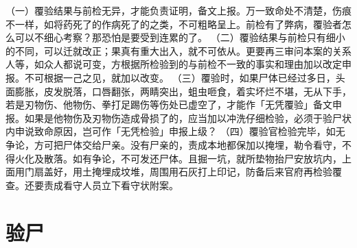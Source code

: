 \documentclass[12pt,UTF8]{ctexbook}
\begin{document}
（一）覆验结果与前检无异，才能负责证明，备文上报。万一致命处不清楚，伤痕不一样，如将药死了的作病死了的之类，不可粗略呈上。前检有了弊病，覆验者怎么可以不细心考察？那恐怕是要受到连累的了。
（二）覆验结果与前检只有细小的不同，可以迁就改正；果真有重大出入，就不可依从。更要再三审问本案的关系人等，如众人都说可变，方根据所检验到的与前检不一致的事实和理由加以改定申报。不可根据一己之见，就加以改变。
（三）覆验时，如果尸体已经过多日，头面膨胀，皮发脱落，口唇翻张，两睛突出，蛆虫咂食，着实坏烂不堪，无从下手，若是刃物伤、他物伤、拳打足踢伤等伤处已虚空了，才能作「无凭覆验」备文申报。如果是他物伤及刃物伤造成骨损了的，应当加以冲洗仔细检验，必须于验尸状内申说致命原因，岂可作「无凭检验」申报上级？
（四）覆验官检验完毕，如无争论，方可把尸体交给尸亲。没有尸亲的，责成本地都保加以掩埋，勒令看守，不得火化及散落。如有争论，不可发还尸体。且掘一坑，就所垫物抬尸安放坑内，上面用门扇盖好，用土掩埋成坟堆，周围用石灰打上印记，防备后来官府再检验覆查。还要责成看守人员立下看守状附案。


\chapter{验尸}
\end{document}
